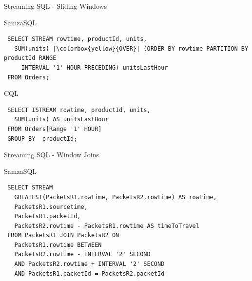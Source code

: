 \documentclass[newPxFont]{beamer}
\begin{document}

\begin{frame}[fragile]{Streaming SQL - Sliding Windows}

\begin{alertblock}{SamzaSQL}
 \begin{verbatim}
 SELECT STREAM rowtime, productId, units,
   SUM(units) |\colorbox{yellow}{OVER}| (ORDER BY rowtime PARTITION BY productId RANGE
     INTERVAL '1' HOUR PRECEDING) unitsLastHour 
 FROM Orders;
 \end{verbatim}
\end{alertblock}

\begin{exampleblock}{CQL}
 \begin{verbatim}
 SELECT ISTREAM rowtime, productId, units, 
   SUM(units) AS unitsLastHour
 FROM Orders[Range '1' HOUR]
 GROUP BY  productId;
 \end{verbatim}
\end{exampleblock}

\end{frame}


\begin{frame}[fragile]{Streaming SQL - Window Joins}

\begin{alertblock}{SamzaSQL}
 \begin{verbatim}
 SELECT STREAM
   GREATEST(PacketsR1.rowtime, PacketsR2.rowtime) AS rowtime,
   PacketsR1.sourcetime,
   PacketsR1.packetId,
   PacketsR2.rowtime - PacketsR1.rowtime AS timeToTravel
 FROM PacketsR1 JOIN PacketsR2 ON
   PacketsR1.rowtime BETWEEN
   PacketsR2.rowtime - INTERVAL '2' SECOND
   AND PacketsR2.rowtime + INTERVAL '2' SECOND
   AND PacketsR1.packetId = PacketsR2.packetId
 \end{verbatim}
\end{alertblock}

\end{frame}

\end{document}

